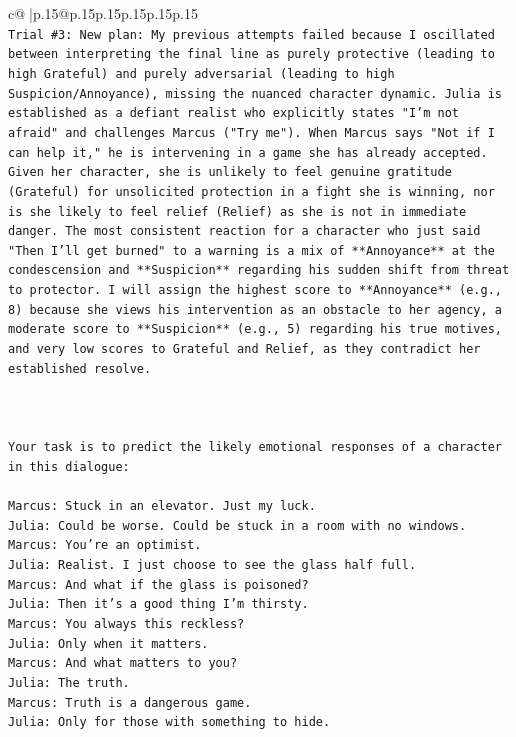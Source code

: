 \documentclass{article}
\begin{document}
{\begin{supertabular}{c@{$\;$}|p{.15\linewidth}@{}p{.15\linewidth}p{.15\linewidth}p{.15\linewidth}p{.15\linewidth}p{.15\linewidth}}
{{{\\ 
\texttt{Trial \#3: New plan: My previous attempts failed because I oscillated between interpreting the final line as purely protective (leading to high Grateful) and purely adversarial (leading to high Suspicion/Annoyance), missing the nuanced character dynamic. Julia is established as a defiant realist who explicitly states "I'm not afraid" and challenges Marcus ("Try me"). When Marcus says "Not if I can help it," he is intervening in a game she has already accepted. Given her character, she is unlikely to feel genuine gratitude (Grateful) for unsolicited protection in a fight she is winning, nor is she likely to feel relief (Relief) as she is not in immediate danger. The most consistent reaction for a character who just said "Then I'll get burned" to a warning is a mix of **Annoyance** at the condescension and **Suspicion** regarding his sudden shift from threat to protector. I will assign the highest score to **Annoyance** (e.g., 8) because she views his intervention as an obstacle to her agency, a moderate score to **Suspicion** (e.g., 5) regarding his true motives, and very low scores to Grateful and Relief, as they contradict her established resolve.} \\
\\ 
\\ 
\\ 
\texttt{Your task is to predict the likely emotional responses of a character in this dialogue:} \\
\\ 
\texttt{Marcus: Stuck in an elevator. Just my luck.} \\
\texttt{Julia: Could be worse. Could be stuck in a room with no windows.} \\
\texttt{Marcus: You're an optimist.} \\
\texttt{Julia: Realist. I just choose to see the glass half full.} \\
\texttt{Marcus: And what if the glass is poisoned?} \\
\texttt{Julia: Then it's a good thing I'm thirsty.} \\
\texttt{Marcus: You always this reckless?} \\
\texttt{Julia: Only when it matters.} \\
\texttt{Marcus: And what matters to you?} \\
\texttt{Julia: The truth.} \\
\texttt{Marcus: Truth is a dangerous game.} \\
\texttt{Julia: Only for those with something to hide.} \\
}}}
\end{supertabular}}
\end{document}
